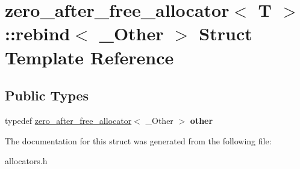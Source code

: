 \hypertarget{structzero__after__free__allocator_1_1rebind}{}\section{zero\+\_\+after\+\_\+free\+\_\+allocator$<$ T $>$\+::rebind$<$ \+\_\+\+Other $>$ Struct Template Reference}
\label{structzero__after__free__allocator_1_1rebind}
\subsection*{Public Types}
\begin{DoxyCompactItemize}
\item 
\mbox{\label{structzero__after__free__allocator_1_1rebind_aef5ba2251ba370df22fbd0a05e3cf284}} 
typedef \mbox{\hyperlink{structzero__after__free__allocator}{zero\+\_\+after\+\_\+free\+\_\+allocator}}$<$ \+\_\+\+Other $>$ {\bfseries other}
\end{DoxyCompactItemize}


The documentation for this struct was generated from the following file\+:\begin{DoxyCompactItemize}
\item 
allocators.\+h\end{DoxyCompactItemize}
